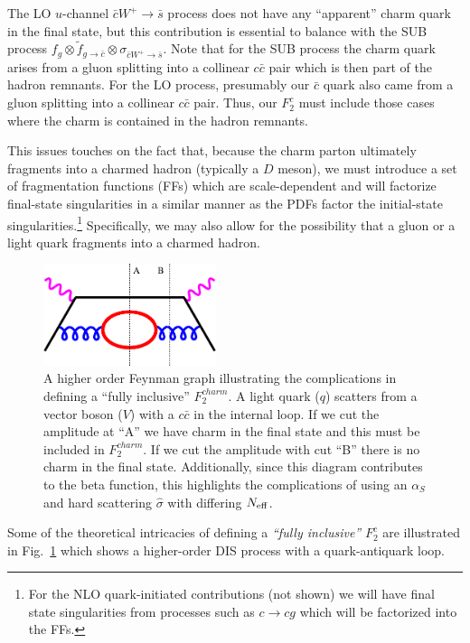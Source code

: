 The LO $u$-channel $\bar{c}W^{+}\to\bar{s}$ process does not have any
``apparent'' charm quark in the final state, but this contribution is
essential to balance with the SUB process
\mbox{$f_{g}\otimes\widetilde{f}_{g\to\bar{c}}\otimes\sigma_{\bar{c}W^{+}\to\bar{s}}$.}
Note that for the SUB process the charm quark arises from a gluon
splitting into a collinear $c\bar{c}$ pair which is then part of the
hadron remnants. For the LO process, presumably our $\bar{c}$ quark
also came from a gluon splitting into a collinear $c\bar{c}$
pair. Thus, our $F_{2}^{c}$ must include those cases where the charm
is contained in the hadron remnants.

This issues touches on the fact that, because the charm parton
ultimately fragments into a charmed hadron (typically a $D$ meson), we
must introduce a set of fragmentation functions (FFs) which are
scale-dependent and will factorize final-state singularities in a
similar manner as the PDFs factor the initial-state
singularities.\footnote{For the NLO quark-initiated contributions (not
  shown) we will have final state singularities from processes such as
  $c\to cg$ which will be factorized into the FFs.} Specifically, we may
also allow for the possibility that a gluon or a light quark fragments
into a charmed hadron.


%
\begin{figure}[t]
\centering \includegraphics[width=0.45\textwidth]{pics/fred/feyngraph}
\caption{A higher order Feynman graph illustrating the complications
  in defining a ``fully inclusive'' $F_{2}^{charm}$.  A light quark
  ($q$) scatters from a vector boson ($V$) with a $c\bar{c}$ in the
  internal loop.  If we cut the amplitude at ``A'' we have charm in
  the final state and this must be included in $F_{2}^{charm}$.  If we
  cut the amplitude with cut ``B'' there is no charm in the final
  state.  Additionally, since this diagram contributes to the beta
  function, this highlights the complications of using an $\alpha_{S}$
  and hard scattering $\hat{\sigma}$ with differing $N_{\rm
    eff}$. \label{fig:bubble}}
\end{figure}


%
Some of the theoretical intricacies of defining a \textit{``fully
  inclusive''} $F_{2}^{c}$ are illustrated in Fig.~\ref{fig:bubble}
which shows a higher-order DIS process with a quark-antiquark loop.

